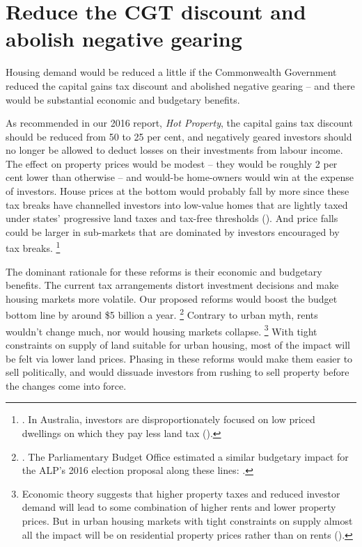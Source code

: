 \section{Reduce the CGT discount and abolish negative gearing}\label{sec:reduce-the-cgt-discount-and-abolish-negative-gearing}

Housing demand would be reduced a little if the Commonwealth Government reduced the capital gains tax discount and abolished negative gearing -- and there would be substantial economic and budgetary benefits.

As recommended in our 2016 report, \emph{Hot Property}, the capital gains tax discount should be reduced from 50 to 25 per cent, and negatively geared investors should no longer be allowed to deduct losses on their investments from labour income.
The effect on property prices would be modest -- they would be roughly 2 per cent lower than otherwise -- and would-be home-owners would win at the expense of investors. House prices at the bottom would probably fall by more since these tax breaks have channelled investors into low-value homes that are lightly taxed under states' progressive land taxes and tax-free thresholds ().
And price falls could be larger in sub-markets that are dominated by investors encouraged by tax breaks.%
    \footnote{\textcites{BIS-2017-interest-rates-house-prices}{Spatial-Herding-Behavior-US-Housing-Market}. In Australia, investors are disproportionately focused on low priced dwellings on which they pay less land tax ().}

The dominant rationale for these reforms is their economic and budgetary benefits.
The current tax arrangements distort investment decisions and make housing markets more volatile.
Our proposed reforms would boost the budget bottom line by around \$5 billion a year.%
	\footnote{\textcite{DaleyWood2016-Negative-Gearing-CGT}. The Parliamentary Budget Office estimated a similar budgetary impact for the ALP's 2016 election proposal along these lines: \textcite[][6]{PBO_2016_postelection_report}.}
Contrary to urban myth, rents wouldn't change much, nor would housing markets collapse.%
    \footnote{Economic theory suggests that higher property taxes and reduced investor demand will lead to some combination of higher rents and lower property prices. But in urban housing markets with tight constraints on supply almost all the impact will be on residential property prices rather than on rents (\textcite[][31]{DaleyWood2016-Negative-Gearing-CGT}).} %
With tight constraints on supply of land suitable for urban housing, most of the impact will be felt via lower land prices.
Phasing in these reforms would make them easier to sell politically, and would dissuade investors from rushing to sell property before the changes come into force.

